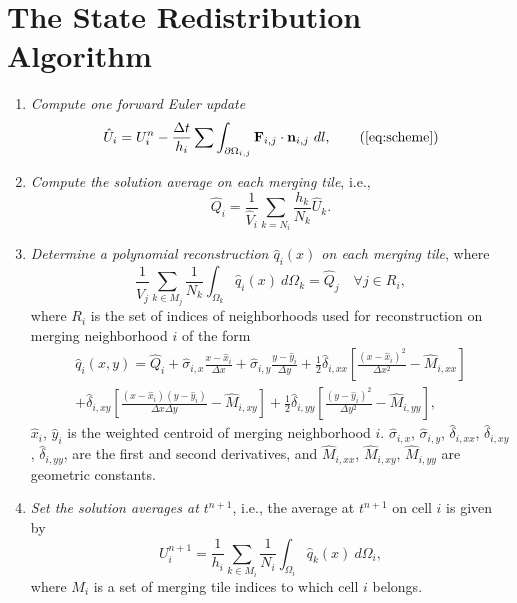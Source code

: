 \section{The State Redistribution Algorithm}\label{srdAlg}
\begin{enumerate}[label=Step \arabic*:]
    \item \textit{Compute one forward Euler update}
    \begin{equation} 
    \hat{U}_i = U^n_i - \frac{\Delta t}{h_i}\sum \int_{\partial \Omega_{i,j}} \mathbf{F}_{i,j} \cdot \mathbf{n}_{i,j}~dl,\tag{\ref{eq:scheme}}
    \end{equation}
	\item \textit{Compute the solution average on each merging tile}, i.e.,
	\begin{equation}\label{eq:q_avg1}
	    \hat Q_i =  \frac{1}{\hat V_i}\sum_{k = N_i}\frac{h_k}{N_k} \hat U_k.
	\end{equation}
\item \textit{Determine a polynomial reconstruction $\hat q_i(x)$ on each merging tile}, where
\begin{equation}\label{eq:qi}
\frac{1}{\hat V_j}\sum_{k \in M_j}\frac{1}{N_k}\int_{\Omega_k} \hat q_i(x)~d\Omega_k = \hat Q_j \quad \forall j \in R_i,
\end{equation}
where $R_i$ is the set of indices of neighborhoods used for reconstruction on merging neighborhood $i$ of the form
\begin{equation}\label{eq:q}
\begin{aligned}
	    \hat q_i(x,y) = \hat Q_{i} + \hat \sigma_{i,x}\frac{x-\hat x_i}{\Delta x} +  \hat \sigma_{i,y}\frac{y-\hat y_i}{\Delta y} + \frac{1}{2}\hat \delta_{i, xx}\left[ \frac{(x - \hat x_i)^2 }{\Delta x^2} - \hat M_{i,xx}\right]\\
	    +\hat \delta_{i, xy}\left[ \frac{(x - \hat x_i) (y - \hat y_i) }{\Delta x \Delta y} - \hat M_{i,xy}\right] + \frac{1}{2}\hat \delta_{i, yy}\left[ \frac{(y - \hat y_i)^2 }{\Delta y^2} -  \hat M_{i,yy}\right],
\end{aligned}
\end{equation}
$\hat x_i$, $\hat y_i$ is the weighted centroid of merging neighborhood $i$. $\hat \sigma_{i,x}$, $\hat \sigma_{i,y}$, $\hat \delta_{i,xx}$, $\hat \delta_{i,xy}$, $\hat \delta_{i,yy}$, are the first and second derivatives, and $ \hat M_{i,xx}$, $\hat M_{i,xy}$,  $\hat M_{i,yy}$ are geometric constants. 

\item \textit{Set the solution averages at $t^{n+1}$}, i.e., the average at $t^{n+1}$ on cell $i$ is given by
	\begin{equation}\label{eq:final_update}
	U^{n+1}_i =  \frac{1}{h_i}\sum_{k \in M_{i}}\frac{1}{N_i}\int_{\Omega_i} \hat q_k(x)~d\Omega_i,
	\end{equation}
	where $M_i$ is a set of merging tile indices to which cell $i$ belongs.
\end{enumerate}

	